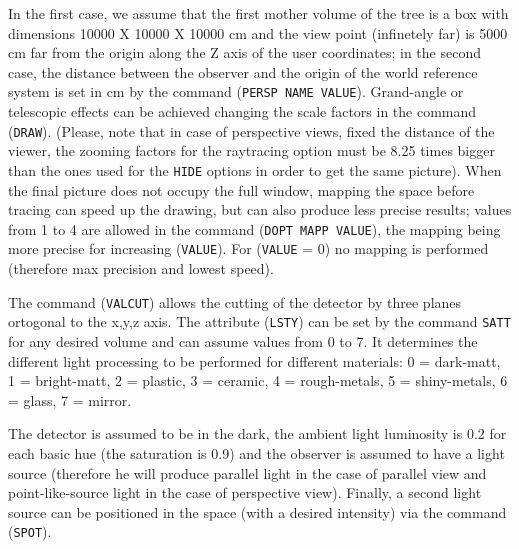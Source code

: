 In the
first case, we assume that the first mother volume of the tree is a box with
dimensions 10000 X 10000 X 10000 cm and the view point (infinetely far) is
5000 cm far from the origin along the Z axis of the user coordinates; in the
second case, the distance between the observer and the origin of the world
reference system is set in cm by the command 
({\tt PERSP NAME VALUE}). 
Grand-angle
or telescopic effects can be achieved changing the scale factors in the command
({\tt DRAW}). 
(Please, note that in case of perspective views, fixed the distance of 
the viewer, the zooming factors for the raytracing option must be 8.25 times
bigger than the ones used for the {\tt HIDE} options in order to get the same
picture).
When the final picture does not occupy the full window,
mapping the space before tracing can speed up the drawing, but can also
produce less precise results; values from 1 to 4 are allowed in the command
({\tt DOPT MAPP VALUE}), 
the mapping being more precise for increasing ({\tt VALUE}). For
({\tt VALUE} = 0) 
no mapping is performed (therefore max precision and lowest speed).

The command ({\tt VALCUT}) allows the cutting of the detector by three planes
ortogonal to the x,y,z axis. The attribute ({\tt LSTY}) can be set 
by the command
{\tt SATT} for any desired volume and can assume values from 0 to 7. 
It determines
the different light processing to be performed for different materials:
0 = dark-matt, 1 = bright-matt, 2 = plastic, 3 = ceramic, 4 = rough-metals,
5 = shiny-metals, 6 = glass, 7 = mirror. 


The detector is assumed to be in the
dark, the ambient light luminosity is 0.2 for each basic hue (the saturation
is 0.9) and the observer is assumed to have a light source (therefore he will
produce parallel light in the case of parallel view and point-like-source
light in the case of perspective view). Finally, a second light source can 
be positioned in the space (with a desired intensity) via the command 
({\tt SPOT}).
 
